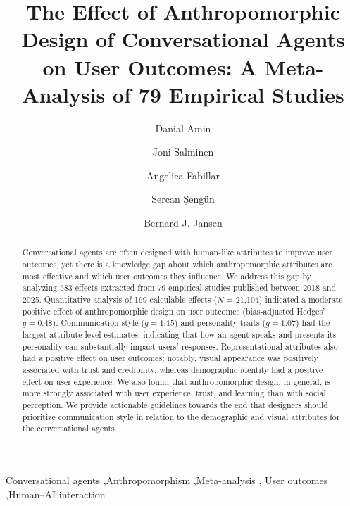 \documentclass[preprint,10pt,authoryear,nonatbib]{elsarticle}
\begin{document}
\begin{frontmatter}


\title{The Effect of Anthropomorphic Design of Conversational Agents on User Outcomes: A Meta-Analysis of 79 Empirical Studies}

\author[aff1]{Danial Amin}

\author[aff1]{Joni Salminen}

\author[aff1]{Angelica Fabillar}

\author[aff2]{Sercan Şengün}

\author[aff3]{Bernard J. Jansen}


\address[aff1]{School of Marketing and Communication, University of Vaasa, Vaasa, Finland}

\address[aff2]{University of Central Florida, Orlando, FL, United States}

\address[aff3]{Peking University, Beijing, China}

\begin{abstract}
Conversational agents are often designed with human-like attributes to improve user outcomes, yet there is a knowledge gap about which anthropomorphic attributes are most effective and which user outcomes they influence. We address this gap by analyzing 583 effects extracted from 79 empirical studies published between 2018 and 2025. Quantitative analysis of 169 calculable effects ($N$ = 21,104) %
indicated a moderate positive effect of anthropomorphic design on user outcomes (bias-adjusted Hedges' $g = 0.48$). Communication style ($g = 1.15$) and personality traits ($g = 1.07$) had the largest attribute-level estimates, indicating that how an agent speaks and presents its personality can substantially impact users’ responses. Representational attributes also had a positive effect on user outcomes; notably, visual appearance was positively associated with trust and credibility, whereas demographic identity had a positive effect on user experience. We also found that anthropomorphic design, in general, is more strongly associated with user experience, trust, and learning than with social perception. We provide actionable guidelines towards the end that designers should prioritize communication style in relation to the demographic and visual attributes for the conversational agents.
\end{abstract}

\begin{keyword}
Conversational agents \sep Anthropomorphism \sep Meta-analysis \sep
User outcomes \sep Human--AI interaction
\end{keyword}

\end{frontmatter}
\end{document}
